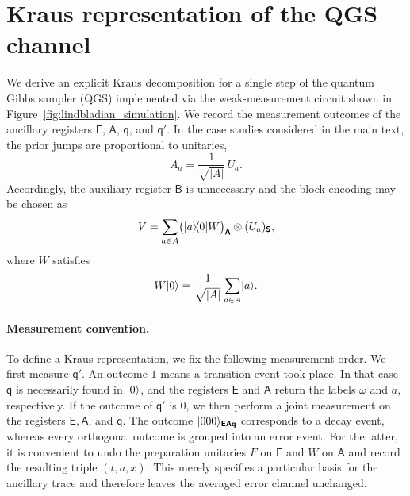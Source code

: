 \documentclass[showpacs,amsmath,amssymb,twocolumn,prx,superscriptaddress,10pt,aps,nofootinbib]{revtex4-2}
\DeclarePairedDelimiter\bra{\langle}{|}
\DeclarePairedDelimiter\ket{|}{\rangle}
\newcommand{\rS}{\boldsymbol{\mathsf{S}}}
\newcommand{\rE}{\boldsymbol{\mathsf{E}}}
\newcommand{\rA}{\boldsymbol{\mathsf{A}}}
\newcommand{\rB}{\boldsymbol{\mathsf{B}}}
\newcommand{\rqq}{\boldsymbol{\mathsf{q}}}
\begin{document}
\section{Kraus representation of the QGS channel}
\label{app:kraus_qgs}

We derive an explicit Kraus decomposition for a single step of the quantum Gibbs sampler (QGS) implemented via the weak-measurement circuit shown in Figure~\ref{fig:lindbladian_simulation}. We record the measurement outcomes of the ancillary registers $\rE$, $\rA$, $\rqq$, and $\rqq'$. In the case studies considered in the main text, the prior jumps are proportional to unitaries,
\begin{equation}
    A_a = \frac{1}{\sqrt{|A|}}\, U_a.
\end{equation}
Accordingly, the auxiliary register $\rB$ is unnecessary and the block encoding may be chosen as
\begin{equation}
    V = \sum_{a\in A} \bigl(\ket{a}\!\bra{0} W\bigr)_{\rA} \otimes (U_a)_{\rS},
\end{equation}
where $W$ satisfies
\begin{equation}
    W\ket{0} = \frac{1}{\sqrt{|A|}} \sum_{a\in A} \ket{a}.
\end{equation}

\paragraph{Measurement convention.}
To define a Kraus representation, we fix the following measurement order. We first measure $\rqq'$. An outcome $1$ means a transition event took place. In that case $\rqq$ is necessarily found in $\ket{0}$, and the registers $\rE$ and $\rA$ return the labels $\omega$ and $a$, respectively. If the outcome of $\rqq'$ is $0$, we then perform a joint measurement on the registers $\rE, \rA$, and $\rqq$. The outcome $\ket{000}_{\rE\rA\rqq}$ corresponds to a decay event, whereas every orthogonal outcome is grouped into an error event. For the latter, it is convenient to undo the preparation unitaries $F$ on $\rE$ and $W$ on $\rA$ and record the resulting triple $(t,a,x)$. This merely specifies a particular basis for the ancillary trace and therefore leaves the averaged error channel unchanged.
\end{document}

